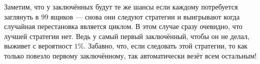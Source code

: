 Заметим, что у заключённых будут те же шансы если каждому потребуется заглянуть в $99$ ящиков --- снова они следуют стратегии и выигрывают когда случайная перестановка является циклом.
В этом случае сразу очевидно, что лучшей стратегии нет.
Ведь у самый первый заключённый, чтобы он не делал, выживет с вероятност $1\%$.
Забавно, что, если следовать этой стратегии, то как только повезло первому заключённому, так автоматически везёт всем остальным!
